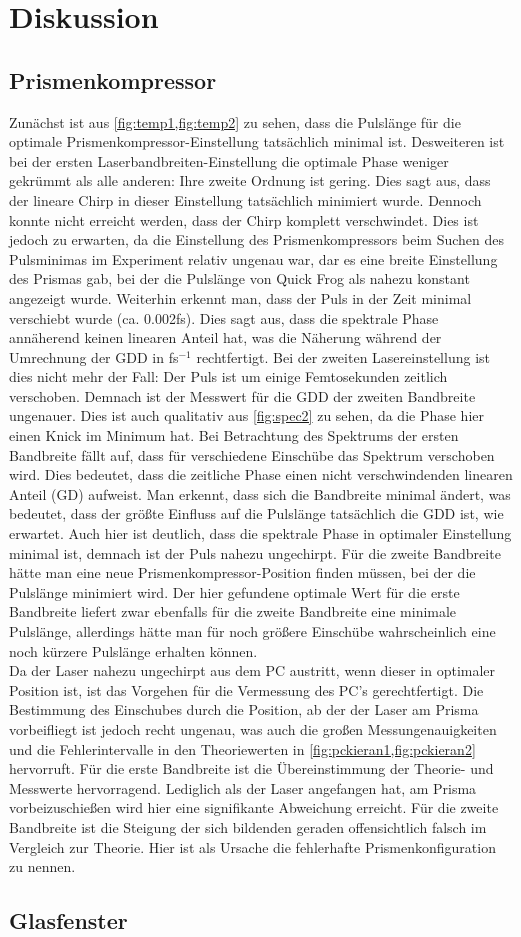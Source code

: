 \documentclass[twoside,        %
               BCOR12mm,       %
               english,ngerman, %
               fleqn,headsepline=false,footsepline=false
              ]{Vorlage/MFPREPORT}
\begin{document}
\section{Diskussion}
\subsection{Prismenkompressor}
Zunächst ist aus \cref{fig:temp1,fig:temp2} zu sehen, dass die Pulslänge für
die optimale Prismenkompressor-Einstellung tatsächlich minimal ist. Desweiteren
ist bei der ersten Laserbandbreiten-Einstellung die optimale Phase weniger
gekrümmt als alle anderen: Ihre zweite Ordnung ist gering. Dies sagt aus, dass
der lineare Chirp in dieser Einstellung tatsächlich minimiert wurde. Dennoch
konnte nicht erreicht werden, dass der Chirp komplett verschwindet. Dies ist
jedoch zu erwarten, da die Einstellung des Prismenkompressors beim Suchen des
Pulsminimas im Experiment relativ ungenau war, dar es eine breite Einstellung
des Prismas gab, bei der die Pulslänge von Quick Frog als nahezu konstant
angezeigt wurde. Weiterhin erkennt man, dass der Puls in der Zeit minimal
verschiebt wurde (ca. 0.002\;fs). Dies sagt aus, dass die spektrale Phase
annäherend keinen linearen Anteil hat, was die Näherung während der Umrechnung
der GDD in fs$^{-1}$ rechtfertigt. Bei der zweiten Lasereinstellung ist dies
nicht mehr der Fall: Der Puls ist um einige Femtosekunden zeitlich verschoben.
Demnach ist der Messwert für die GDD der zweiten Bandbreite ungenauer. Dies ist
auch qualitativ aus \cref{fig:spec2} zu sehen, da die Phase hier einen Knick im
Minimum hat. Bei Betrachtung des Spektrums der ersten Bandbreite fällt auf,
dass für verschiedene Einschübe das Spektrum verschoben wird. Dies bedeutet,
dass die zeitliche Phase einen nicht verschwindenden linearen Anteil (GD)
aufweist. Man erkennt, dass sich die Bandbreite minimal ändert, was bedeutet,
dass der größte Einfluss auf die Pulslänge tatsächlich die GDD ist, wie
erwartet. Auch hier ist deutlich, dass die spektrale Phase in optimaler
Einstellung minimal ist, demnach ist der Puls nahezu ungechirpt.
Für die zweite Bandbreite hätte man eine neue Prismenkompressor-Position finden
müssen, bei der die Pulslänge minimiert wird. Der hier gefundene optimale Wert
für die erste Bandbreite liefert zwar ebenfalls für die zweite Bandbreite eine
minimale Pulslänge, allerdings hätte man für noch größere Einschübe
wahrscheinlich eine noch kürzere Pulslänge erhalten können.\\
Da der Laser nahezu ungechirpt aus dem PC austritt, wenn dieser in optimaler
Position ist, ist das Vorgehen für die Vermessung des PC's gerechtfertigt. Die
Bestimmung des Einschubes durch die Position, ab der der Laser am Prisma
vorbeifliegt ist jedoch recht ungenau, was auch die großen Messungenauigkeiten
und die Fehlerintervalle in den Theoriewerten in
\cref{fig:pckieran1,fig:pckieran2} hervorruft. Für die erste Bandbreite ist die
Übereinstimmung der Theorie- und Messwerte hervorragend. Lediglich als der
Laser angefangen hat, am Prisma vorbeizuschießen wird hier eine signifikante
Abweichung erreicht. Für die zweite Bandbreite ist die Steigung der sich
bildenden geraden offensichtlich falsch im Vergleich zur Theorie. Hier ist als
Ursache die fehlerhafte Prismenkonfiguration zu nennen.
\subsection{Glasfenster}



\end{document}
